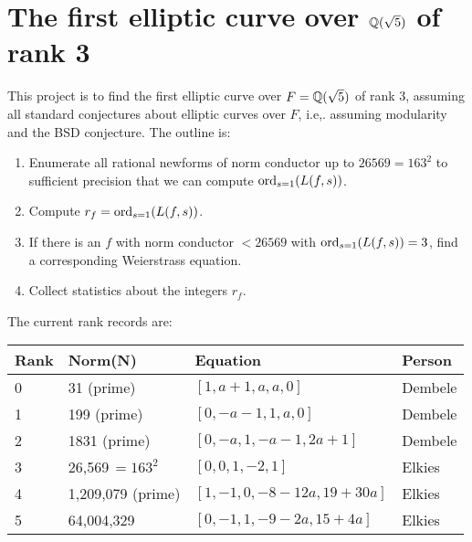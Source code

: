 \documentclass{article}
\begin{document}
\section{The first elliptic curve over $\mathbb{Q}(\sqrt{5})$ of rank 3}
This project is to find the first elliptic curve over $F=\mathbb{Q}(\sqrt{5})$ of rank 3,
assuming all standard conjectures about elliptic curves over $F$, i.e,. assuming
modularity and the BSD conjecture.  The outline is:
\begin{enumerate}
\item Enumerate all rational newforms of norm conductor up to $26569=163^2$ to
sufficient precision that we can compute $\operatorname{ord}_{s=1}(L(f,s))$.
\item Compute $r_f = \operatorname{ord}_{s=1}(L(f,s))$.
\item If there is an $f$ with norm conductor $<26569$ with $\operatorname{ord}_{s=1}(L(f,s))=3$, find a corresponding Weierstrass equation.
\item Collect statistics about the integers $r_f$.
\end{enumerate}
The current rank records are:
\begin{center}
\begin{tabular}{|l|l|l|l|}\hline
Rank & Norm(N) & Equation & Person\\\hline
0 & 31 (prime) &  $[1,a+1,a,a,0]$ &  Dembele \\
1 & 199 (prime) &  $[0,-a-1,1,a,0]$ &  Dembele \\
2 & 1831 (prime) &  $[0,-a,1,-a-1,2a+1]$ & Dembele \\
3 & 26,569$\,=163^2$ &  $[0,0,1,-2,1]$ & Elkies \\
4 & 1,209,079 (prime) & $[1, -1, 0, -8-12a, 19+30a]$ & Elkies \\
5 & 64,004,329 & $[0, -1, 1, -9-2a, 15+4a]$ & Elkies
\\\hline
\end{tabular}
\end{center}
\end{document}
